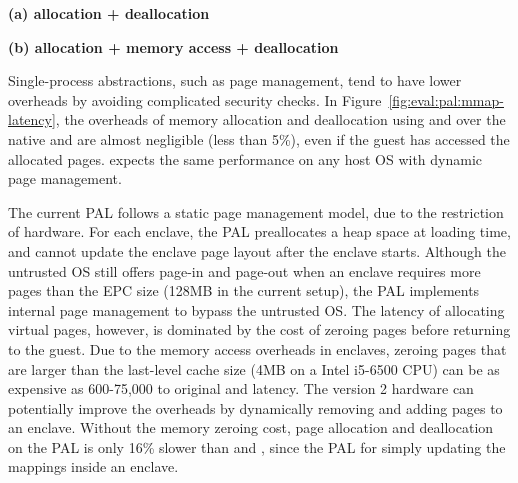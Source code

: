 \label{sec:eval:pal:memory}

\begin{figure*}[t!]
\centering
\footnotesize
{}
\parbox{0.49\textwidth}{\centering\bf (a) allocation + deallocation}
\parbox{0.49\textwidth}{\centering\bf (b) allocation + memory access + deallocation}
\caption{Latency of (a) allocating and deallocating a range of virtual pages, and (b) the same operations with writing to each page after allocation. Lower is better.
The comparison is between (1)  and  on Linux; (2)  and  on the Linux PAL, with and without a \seccomp{} filter ({\bf +SC}) and reference monitor ({\bf +RM}); (3) the same \hostapis{} on the \sgx{} PAL, with and without zeroing the pages before use ({\bf +Zero}).}
\label{fig:eval:pal:mmap-latency}
\end{figure*}

Single-process abstractions, such as page management,
tend to have lower overheads
by avoiding complicated security checks.
In Figure~\ref{fig:eval:pal:mmap-latency},
the overheads of memory allocation and deallocation using  and 
over the native  and 
are almost negligible (less than 5\%),
even if the guest has accessed the allocated pages.
\graphene{} expects the same performance on any host OS with dynamic page management.



The current \sgx{} PAL follows a static page management model,
due to the restriction of \sgx{} hardware.
For each enclave,
the \sgx{} PAL preallocates a heap space
at loading time,
and cannot update the enclave page layout
after the enclave starts. 
Although the untrusted OS still offers page-in and page-out
when an enclave requires more pages
than the EPC size (128MB in the current setup),
the \sgx{} PAL implements
internal page management to bypass the untrusted OS.
The latency
of allocating virtual pages, however,
is dominated by the cost of zeroing pages before returning to the guest.
Due to the memory access overheads in enclaves,
zeroing pages that are larger than the last-level cache size (4MB on a Intel i5-6500 CPU)
can be as expensive as 600-75,000\x{} to original  and  latency.
The \sgx{} version 2 hardware
can potentially improve the overheads by dynamically removing and adding pages to an enclave.
Without the memory zeroing cost,
page allocation and deallocation on the \sgx{} PAL
is only \roughly{}16\% slower than  and ,
since the \sgx{} PAL
for simply updating the mappings
inside an enclave.

